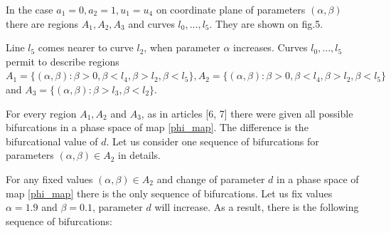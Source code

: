 \documentclass[12pt]{amsart}
\begin{document}
In the case $ a_1 = 0, a_2 = 1, u_1 = u_4 $ on coordinate plane of parameters $ (\alpha, \beta) $ there are regions $ A_1, A_2, A_3 $ and curves $ l_0, ..., l_5 $. They are shown on fig.5.

Line $ l_5 $ comes nearer to curve $ l_2 $, when parameter $ \alpha $ increases. Curves $ l_0, ..., l_5 $ permit to describe regions $ A_1 = \{ (\alpha, \beta): \beta>0, \beta<l_4, \beta>l_2, \beta<l_5 \} , A_2 = \{ (\alpha, \beta): \beta>0, \beta<l_4, \beta>l_2, \beta<l_5 \} $ and $ A_3 = \{ (\alpha, \beta): \beta > l_3, \beta < l_2  \} $.

\hspace{1.5cm}
\begin{minipage}[h]{0.65\linewidth}
\end{minipage}
\vspace{0.1cm}

For every region $ A_1, A_2 $ and $ A_3 $, as in articles [6, 7] there were given all possible bifurcations in a phase space of map \eqref{phi_map}. The difference is the bifurcational value of $ d $. Let us consider one sequence of bifurcations for parameters $ (\alpha, \beta) \in A_2 $ in details.

For any fixed values $ (\alpha, \beta) \in A_2 $ and change of parameter $ d $ in a phase space of map \eqref{phi_map} there is the only sequence of bifurcations. Let us fix values $ \alpha = 1.9 $ and $ \beta = 0.1 $, parameter $ d $ will increase. As a result, there is the following sequence of bifurcations:
\end{document}
